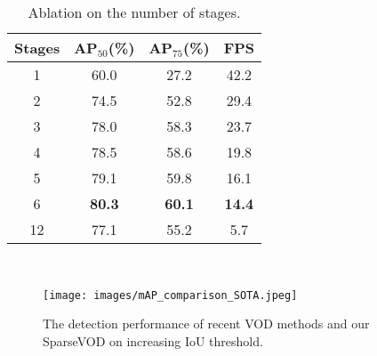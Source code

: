 \documentclass{bmvc2k}
\begin{document}
\begin{minipage}{\linewidth}
\begin{minipage}{0.35\linewidth}
    \vspace{-10pt}
    \hspace{-10pt}
  \begin{table}[H]
    \small
    \begin{tabular}{c|ccc}
        \toprule
        Stages & AP$_{50}$(\%) & AP$_{75}$(\%) & FPS\\
        \hline
        1 & 60.0 & 27.2 & 42.2\\
        2 & 74.5 & 52.8 & 29.4\\
        3 & 78.0 & 58.3 & 23.7\\
        4 & 78.5 & 58.6 & 19.8\\
        5 & 79.1 & 59.8 & 16.1\\
        {6} & \textbf{80.3} & \textbf{60.1} & \textbf{14.4}\\
        12 & 77.1 & 55.2 & 5.7\\
        \bottomrule
  \end{tabular}\\
  \vspace{-5pt}
  \caption{Ablation on the number of stages.}
  \label{subtab:stages}
  \end{table}
  \end{minipage}
  \hspace{0.05\linewidth}
  \begin{minipage}{0.5\linewidth}
  \vspace{-10pt}

      \begin{figure}[H]
        \texttt{[image: images/mAP\_comparison\_SOTA.jpeg]}
        \vspace{-20pt}
        \caption{The detection performance of recent VOD methods and our SparseVOD on increasing IoU threshold.}
        \label{fig:high_quality_AP}
    \end{figure}
  \end{minipage}
\end{minipage}
\end{document}
